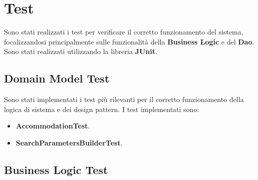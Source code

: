 \documentclass[10pt]{article}
\begin{document}
\section{Test}

Sono stati realizzati i test per verificare il corretto funzionamento del sistema, focalizzandosi principalmente sulle funzionalit\`a della \textbf{Business Logic} e del \textbf{Dao}. Sono stati realizzati utilizzando la libreria \textbf{JUnit}. 

\subsection{Domain Model Test}

Sono stati implementati i test pi\`u rilevanti per il corretto funzionamento della logica di sistema e dei design pattern.
I test implementati sono: 
\begin{itemize}
\item \textbf{AccommodationTest}.
\item \textbf{SearchParametersBuilderTest}.
\end{itemize}

\subsection{Business Logic Test}
\end{document}

